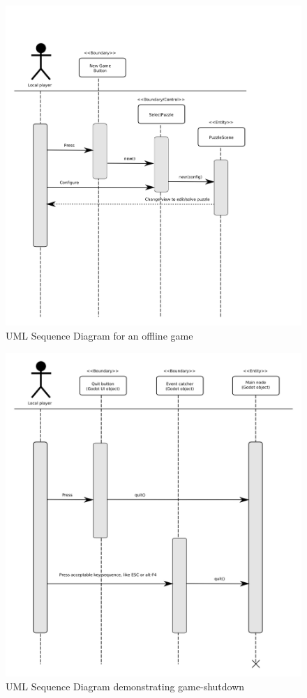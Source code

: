 \documentclass[12pt]{article}
\begin{document}
    \begin{figure}[H]
        \centering
        \includegraphics[width=6in]{sequence_offline_play.png}
        \caption{UML Sequence Diagram for an offline game}
    \end{figure}


    \begin{figure}[H]
        \centering
        \includegraphics[width=6in]{sequence_quit.png}
        \caption{UML Sequence Diagram demonstrating game-shutdown}
    \end{figure}
\end{document}
